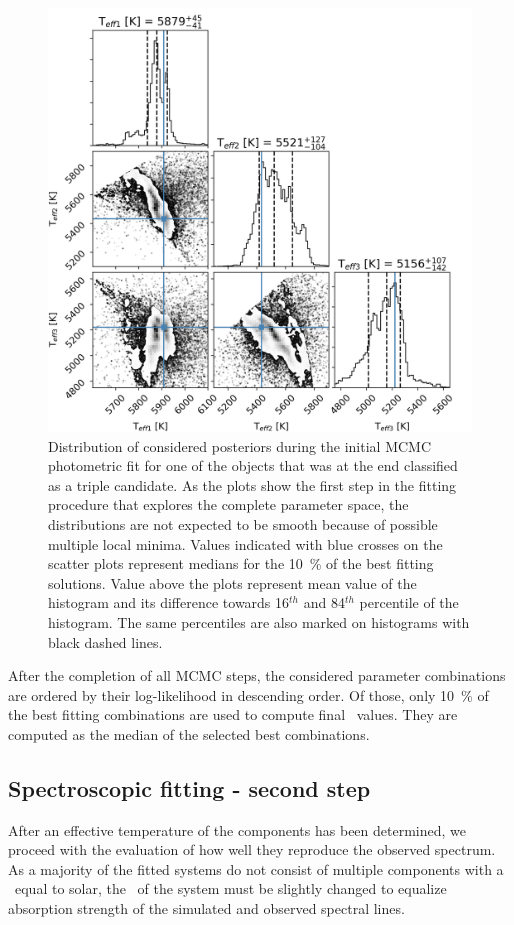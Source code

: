 \begin{figure}
	\centering
	\includegraphics[width=\textwidth]{150408004101169_p1884_corner_3star_00.png}
	\caption{Distribution of considered posteriors during the initial MCMC photometric fit for one of the objects that was at the end classified as a triple candidate. As the plots show the first step in the fitting procedure that explores the complete parameter space, the distributions are not expected to be smooth because of possible multiple local minima. Values indicated with blue crosses on the scatter plots represent medians for the 10~\% of the best fitting solutions. Value above the plots represent mean value of the histogram and its difference towards 16$^{th}$ and 84$^{th}$ percentile of the histogram. The same percentiles are also marked on histograms with black dashed lines.}
	\label{fig:posterior_dist}
\end{figure}

After the completion of all MCMC steps, the considered parameter combinations are ordered by their log-likelihood in descending order. Of those, only 10~\% of the best fitting combinations are used to compute final \Teffn{[1-3]}\ values. They are computed as the median of the selected best combinations. 

\subsection{Spectroscopic fitting - second step}
\label{sec:spectrum_fit}
After an effective temperature of the components has been determined, we proceed with the evaluation of how well they reproduce the observed spectrum. As a majority of the fitted systems do not consist of multiple components with a \Teff\ equal to solar, the \Feh\ of the system must be slightly changed to equalize absorption strength of the simulated and observed spectral lines.

